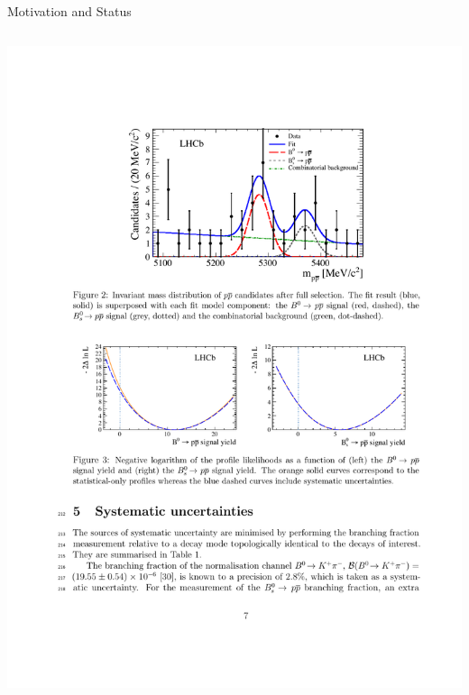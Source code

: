 \documentclass{beamer}
\begin{document}
\begin{frame}{ Motivation and Status}
\begin{columns}
\begin{column}{0.34\textwidth}
      \includegraphics[width=\textwidth]{2011PPbar.pdf}
    \end{column}
  \end{columns}
\end{frame}
\end{document}
